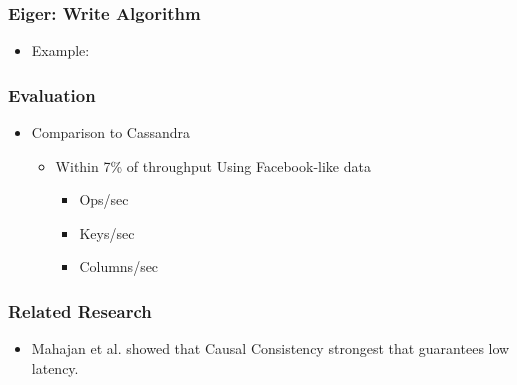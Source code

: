 \documentclass{beamer}
\begin{document}
\begin{frame}
\frametitle{Eiger: Write Algorithm}
\begin{itemize}
	\item Example:
\end{itemize}  
\end{frame}




\begin{frame}
\frametitle{Evaluation}
\begin{itemize}
\pause \item Comparison to Cassandra
		\begin{itemize}
			\item Within 7\% of throughput Using Facebook-like data
			\begin{itemize}
				\item Ops/sec
				\item Keys/sec
				\item Columns/sec
			\end{itemize}
		\end{itemize}
\end{itemize}  
\end{frame}

\begin{frame}
\frametitle{Related Research}
\begin{itemize}
\pause \item Mahajan et al. showed that Causal Consistency strongest that guarantees low latency.
\end{itemize}  
\end{frame}
\end{document}
